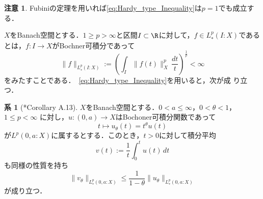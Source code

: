 \documentclass[paper=a4,
fontsize=12pt,
reqno,
uplatex,
dvipdfmx]{jlreq}
\theoremstyle{definition} %
\newtheorem{corollary}[theorem]{系}
\newtheorem*{remark}{注意}
\begin{document}
\begin{remark}
 Fubiniの定理を用いれば\eqref{eq:Hardy_type_Inequality}は$p=1$でも成立す
 る．
\end{remark}

$X$をBanach空間とする．$1\geq p>\infty$と区間$I\subset\R$に対して，$f\in
L^p_*(I:X)$であるとは，$f:I\rightarrow X$がBochner可積分であって
\begin{equation}
 \|f\|_{L^p_*(I:X)}
  :=
  \left(
  \int_I
  \|f(t)\|_X^p
  \,\frac{dt}{t}
  \right)^{\frac{1}{p}}
  <\infty
\end{equation}
をみたすことである．~\eqref{eq:Hardy_type_Inequality}を用いると，次が成
り立つ．

\begin{corollary}[\cite{MR2523200}*{Corollary A.13}]
 $X$をBanach空間とする．$0<a\leq \infty$，$0<\theta<1$，$1\leq p<\infty$
 に対し，$u:(0,a)\rightarrow X$はBochoner可積分関数であって
\begin{equation}
 t\mapsto u_\theta(t)=t^\theta u(t)
\end{equation}
 が$L^p(0,a:X)$に属するとする．このとき，$t>0$に対して積分平均
 \begin{equation}
  v(t)
   :=
   \frac{1}{t}
   \int_0^tu(t)\,dt
 \end{equation}
 も同様の性質を持ち
 \begin{equation}
  \label{eq:Bochoner-Mean-Inequality}
   \|v_\theta\|_{L^p_*(0,a:X)}
   \leq
   \frac{1}{1-\theta}
  \|u_\theta\|_{L^p_*(0,a:X)}
 \end{equation}
 が成り立つ．
\end{corollary}
\end{document}
